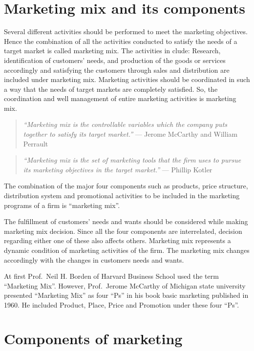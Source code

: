 \documentclass[11pt,]{book}
\theoremstyle{definition}
\theoremstyle{definition}
\theoremstyle{definition}
\theoremstyle{remark}
\begin{document}
\section{Marketing mix and its
components}\label{marketing-mix-and-its-components}

Several different activities should be performed to meet the marketing
objectives. Hence the combination of all the activities conducted to
satisfy the needs of a target market is called marketing mix. The
activities in clude: Research, identification of customers' needs, and
production of the goods or services accordingly and satisfying the
customers through sales and distribution are included under marketing
mix. Marketing activities should be coordinated in such a way that the
needs of target markets are completely satisfied. So, the coordination
and well management of entire marketing activities is marketing mix.

\begin{quote}
\emph{``Marketing mix is the controllable variables which the company
puts together to satisfy its target market.''} --- Jerome McCarthy and
William Perrault
\end{quote}

\begin{quote}
\emph{``Marketing mix is the set of marketing tools that the firm uses
to pursue its marketing objectives in the target market.''} --- Phillip
Kotler
\end{quote}

The combination of the major four components such as products, price
structure, distribution system and promotional activities to be included
in the marketing programs of a firm is ``marketing mix''.

The fulfillment of customers' needs and wants should be considered while
making marketing mix decision. Since all the four components are
interrelated, decision regarding either one of these also affects
others. Marketing mix represents a dynamic condition of marketing
activities of the firm. The marketing mix changes accordingly with the
changes in customers needs and wants.

At first Prof.~Neil H. Borden of Harvard Business School used the term
``Marketing Mix''. However, Prof.~Jerome McCarthy of Michigan state
university presented ``Marketing Mix'' as four ``Ps'' in his book basic
marketing published in 1960. He included Product, Place, Price and
Promotion under these four ``Ps''.

\section{Components of marketing}\label{components-of-marketing}
\end{document}
